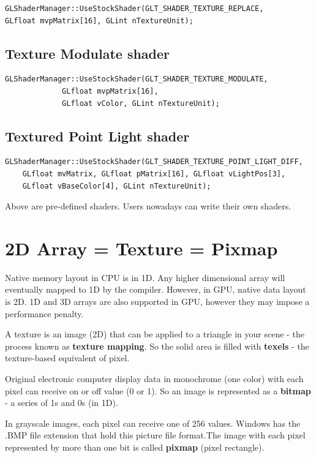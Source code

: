 \begin{verbatim}
GLShaderManager::UseStockShader(GLT_SHADER_TEXTURE_REPLACE,
GLfloat mvpMatrix[16], GLint nTextureUnit);
\end{verbatim}

\subsection{Texture Modulate shader}
\label{sec:text-modul-shad}

\begin{verbatim}
GLShaderManager::UseStockShader(GLT_SHADER_TEXTURE_MODULATE, 
             GLfloat mvpMatrix[16],
             GLfloat vColor, GLint nTextureUnit);
\end{verbatim}

\subsection{Textured Point Light shader}
\label{sec:textured-point-light}

\begin{verbatim}
GLShaderManager::UseStockShader(GLT_SHADER_TEXTURE_POINT_LIGHT_DIFF,
    GLfloat mvMatrix, GLfloat pMatrix[16], GLfloat vLightPos[3],
    GLfloat vBaseColor[4], GLint nTextureUnit);
\end{verbatim}

Above are pre-defined shaders. Users nowadays can write their own
shaders. 

\section{2D Array = Texture = Pixmap}
\label{sec:arrays-=-textures}

Native memory layout in CPU is in 1D. Any higher dimensional array
will eventually mapped to 1D by the compiler. 
However, in GPU, native data layout is 2D. 1D and 3D arrays are also
supported in GPU, however they may impose a performance penalty.

\begin{framed}
  A texture is an image (2D) that can be applied to a triangle in your
  scene - the process known as {\bf texture mapping}. So the solid
  area is filled with {\bf texels} - the texture-based equivalent of
  pixel.

  Original electronic computer display data in monochrome (one color)
  with each pixel can receive on or off value (0 or 1). So an image is
  represented as a {\bf bitmap} - a series of 1s and 0s (in 1D). 

  In grayscale images, each pixel can receive one of 256
  values. Windows has the .BMP file extension that hold this picture
  file format.The image with each pixel represented by more than one
  bit is called {\bf pixmap} (pixel rectangle).
\end{framed}

